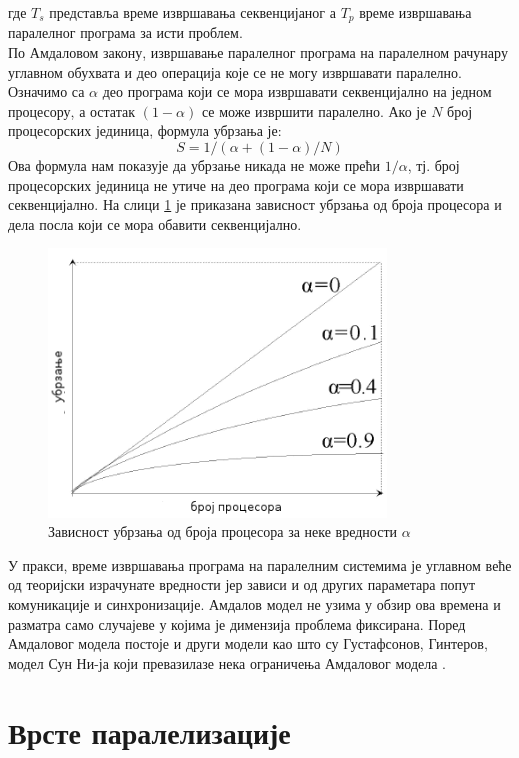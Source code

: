 \documentclass[12pt,oneside]{memoir}
\begin{document}
\noindent где $ T_s $ представља време извршавања секвенцијаног а $ T_p $ време извршавања паралелног програма за исти проблем. 
 	\\
 	\indent По Амдаловом закону, извршавање паралелног програма на паралелном рачунару углавном обухвата и део операција које се не могу извршавати паралелно. Означимо са $ \alpha $ део програма који се мора извршавати секвенцијално на једном процесору, а остатак $ (1 - \alpha)$ се може извршити паралелно. Ако је $ N $ број процесорских јединица, формула убрзања је: 
 	$$ S = 1 / ( \alpha + (1-\alpha)/N)$$
Ова формула нам показује да убрзање никада не може прећи $ 1/\alpha $, тј. број процесорских јединица не утиче на део програма који се мора извршавати секвенцијално. На слици \ref{fig:amdal} је приказана зависност убрзања од броја процесора и дела посла који се мора обавити секвенцијално.

 \begin{figure}[!ht]
  \centering
  \includegraphics[width=0.8\textwidth]{amdal.png}
  \caption{Зависност убрзања од броја процесора за неке вредности $ \alpha $ }
  \label{fig:amdal}
\end{figure}


 \indent У пракси, време извршавања програма на паралелним системима је углавном веће од теоријски израчунате вредности јер зависи и од других параметара попут комуникације и синхронизације. Амдалов модел не узима у обзир ова времена и разматра само случајеве у којима је димензија проблема фиксирана. Поред Амдаловог модела постоје и други модели као што су Густафсонов, Гинтеров, модел Сун Ни-ја који превазилазе нека ограничења Амдаловог модела \cite{performance}.
 	 


  \section{Врсте паралелизације}
  
\end{document}
